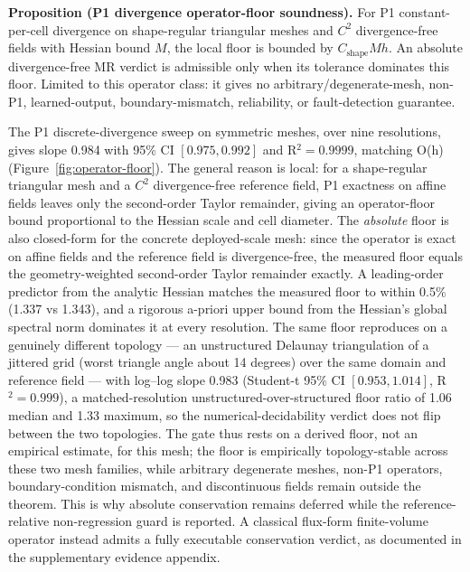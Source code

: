 \documentclass[preprint,12pt,authoryear]{elsarticle}
\begin{document}
\noindent\begin{minipage}{\linewidth}
\textbf{Proposition (P1 divergence operator-floor soundness).}
For P1 constant-per-cell divergence on shape-regular triangular meshes and
$C^2$ divergence-free fields with Hessian bound $M$, the local floor is bounded
by $C_{\mathrm{shape}}Mh$. An absolute divergence-free MR verdict is admissible
only when its tolerance dominates this floor. Limited to this operator class:
it gives no arbitrary/degenerate-mesh, non-P1, learned-output,
boundary-mismatch, reliability, or fault-detection guarantee.
\end{minipage}
\medskip

The P1 discrete-divergence sweep on symmetric meshes, over nine resolutions, gives slope 0.984 with 95\% CI $[0.975, 0.992]$ and R$^2=0.9999$, matching O(h) (Figure~\ref{fig:operator-floor}). The general reason is local: for a shape-regular triangular mesh and a $C^2$ divergence-free reference field, P1 exactness on affine fields leaves only the second-order Taylor remainder, giving an operator-floor bound proportional to the Hessian scale and cell diameter. The \emph{absolute} floor is also closed-form for the concrete deployed-scale mesh: since the operator is exact on affine fields and the reference field is divergence-free, the measured floor equals the geometry-weighted second-order Taylor remainder exactly. A leading-order predictor from the analytic Hessian matches the measured floor to within 0.5\% (1.337 vs 1.343), and a rigorous a-priori upper bound from the Hessian's global spectral norm dominates it at every resolution. The same floor reproduces on a genuinely different topology --- an unstructured Delaunay triangulation of a jittered grid (worst triangle angle about 14 degrees) over the same domain and reference field --- with log--log slope 0.983 (Student-t 95\% CI $[0.953, 1.014]$, R$^2=0.999$), a matched-resolution unstructured-over-structured floor ratio of 1.06 median and 1.33 maximum, so the numerical-decidability verdict does not flip between the two topologies. The gate thus rests on a derived floor, not an empirical estimate, for this mesh; the floor is empirically topology-stable across these two mesh families, while arbitrary degenerate meshes, non-P1 operators, boundary-condition mismatch, and discontinuous fields remain outside the theorem. This is why absolute conservation remains deferred while the reference-relative non-regression guard is reported. A classical flux-form finite-volume operator instead admits a fully executable conservation verdict, as documented in the supplementary evidence appendix.
\end{document}
